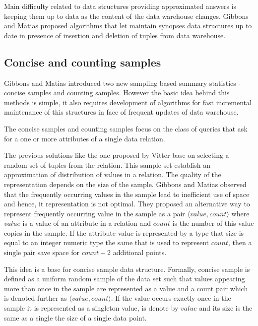 Main difficulty related to data structures providing approximated answers is
keeping them up to data as the content of the data warehouse changes.
Gibbons and Matias \cite{GM98} proposed algorithms that let
maintain synopses data structures up to date in presence of insertion
and deletion of tuples from data warehouse.

\subsection{Concise and counting samples}
Gibbons and Matias \cite{GM98} introduced two new sampling based summary
statistics - concise samples and counting
  samples. However the basic idea behind this methods is simple, it
also requires development of algorithms for fast incremental
maintenance of this structures in face of frequent updates of data
warehouse.

The concise samples and counting samples focus on the class of queries
that ask for a one or more attributes of a single data relation.

The previous solutions like the one proposed by Vitter \cite{Vit85}
base on selecting a random set of tuples from the relation.
This sample set establish an approximation of distribution of values
in a relation. The quality of the representation depends on the size of
the sample. Gibbons and Matias observed that the frequently occurring values in the
sample lead to inefficient use of space and hence, it representation
is not optimal.
They proposed an alternative way to represent frequently occurring
value in the sample as a pair $\langle value, count \rangle$ where
$value$ is a value of an attribute in a relation and $count$ is the
number of this value copies in the sample. If the attribute value is
represented by a type that size is equal to an integer numeric
type the same that is used to represent $count$, then a single pair
save space for $count - 2$ additional points.

This idea is a base for concise sample data structure. Formally,
concise sample is defined as a uniform
random sample of the data set such that values appearing more than
once in the sample are represented as a value and a count pair which
is denoted further as $\langle value, count \rangle$. If the
value occurs exactly once in the sample it is represented as a
singleton value, is denote by $value$ and its size is the same as a
single the size of a single data point.


